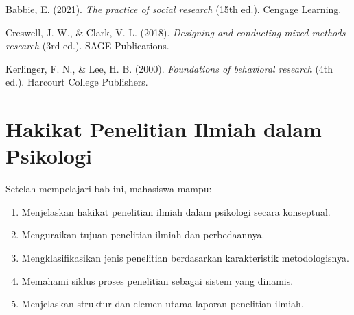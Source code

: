 \documentclass[
  indonesian,
  letterpaper,
  DIV=11,
  numbers=noendperiod]{scrreprt}
\newlength{\cslhangindent}
\newenvironment{CSLReferences}[2] %
 {\begin{list}{}{%
  \setlength{\itemindent}{0pt}
  \setlength{\leftmargin}{0pt}
  \setlength{\parsep}{0pt}
  \ifodd #1
   \setlength{\leftmargin}{\cslhangindent}
   \setlength{\itemindent}{-1\cslhangindent}
  \fi
  \setlength{\itemsep}{#2\baselineskip}}}
 {\end{list}}
\providecommand{\tightlist}{%
  \setlength{\itemsep}{0pt}\setlength{\parskip}{0pt}}
\begin{document}
\label{refs--1}
\begin{CSLReferences}{1}{0}
Babbie, E. (2021). \emph{The practice of social research} (15th ed.).
Cengage Learning.

Creswell, J. W., \& Clark, V. L. (2018). \emph{Designing and conducting
mixed methods research} (3rd ed.). SAGE Publications.

Kerlinger, F. N., \& Lee, H. B. (2000). \emph{Foundations of behavioral
research} (4th ed.). Harcourt College Publishers.

\end{CSLReferences}

\chapter{Hakikat Penelitian Ilmiah dalam
Psikologi}\label{hakikat-penelitian-ilmiah-dalam-psikologi}

\begin{tcolorbox}[enhanced jigsaw, colframe=quarto-callout-note-color-frame, toptitle=1mm, breakable, leftrule=.75mm, arc=.35mm, toprule=.15mm, colback=white, colbacktitle=quarto-callout-note-color!10!white, bottomtitle=1mm, bottomrule=.15mm, titlerule=0mm, title=\textcolor{quarto-callout-note-color}{\faInfo}\hspace{0.5em}{Capaian Pembelajaran}, coltitle=black, left=2mm, opacitybacktitle=0.6, opacityback=0, rightrule=.15mm]

Setelah mempelajari bab ini, mahasiswa mampu:

\begin{enumerate}
\def\labelenumi{\arabic{enumi}.}
\tightlist
\item
  Menjelaskan hakikat penelitian ilmiah dalam psikologi secara
  konseptual.
\item
  Menguraikan tujuan penelitian ilmiah dan perbedaannya.
\item
  Mengklasifikasikan jenis penelitian berdasarkan karakteristik
  metodologisnya.
\item
  Memahami siklus proses penelitian sebagai sistem yang dinamis.
\item
  Menjelaskan struktur dan elemen utama laporan penelitian ilmiah.
\end{enumerate}

\end{tcolorbox}
\end{document}
